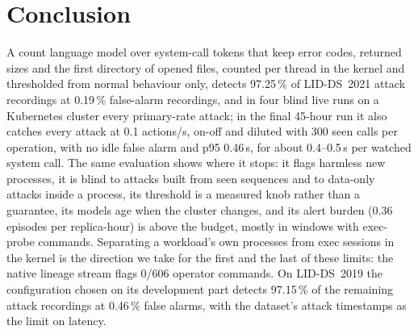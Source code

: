 \section{Conclusion}\label{sec:conclusion}

A count language model over system-call tokens that keep error codes, returned sizes and the first directory of opened
files, counted per thread in the kernel and thresholded from normal behaviour only, detects 97.25\,\% of LID-DS~2021
attack recordings at 0.19\,\% false-alarm recordings, and in four blind live runs on a Kubernetes cluster every
primary-rate attack; in the final 45-hour run it also catches every attack at 0.1 actions/s, on-off and diluted with
300 seen calls per operation, with no idle false alarm and p95 0.46\,s, for about 0.4--0.5\,\textmu s per watched
system call. The same evaluation shows where it stops: it flags harmless new processes, it is blind to attacks built from
seen sequences and to data-only attacks inside a process, its threshold is a measured knob rather than a guarantee, its
models age when the cluster changes, and its alert burden (0.36 episodes per replica-hour) is above the budget, mostly
in windows with exec-probe commands. Separating a workload's own processes from exec sessions in the kernel is the
direction we take for the first and the last of these limits: the native lineage stream flags 0/606 operator
commands. On LID-DS~2019 the configuration chosen on its development part detects 97.15\,\% of the remaining attack
recordings at 0.46\,\% false alarms, with the dataset's attack timestamps as the limit on latency.
